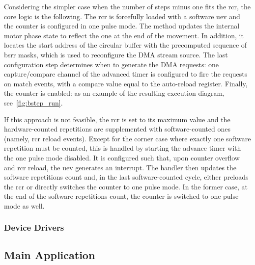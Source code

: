 Considering the simpler case when the number of steps minus one fits the \ac{rcr}, the core logic is the following.
The \ac{rcr} is forcefully loaded with a software \ac{uev} and the counter is configured in one pulse mode.
The  method updates the internal motor phase state to reflect the one at the end of the movement. In addition, it locates the start address of the circular buffer with the precomputed sequence of \ac{bsrr} masks, which is used to reconfigure the DMA stream source. The last configuration step determines when to generate the DMA requests: one capture/compare channel of the advanced timer is configured to fire the requests on match events, with a compare value equal to the auto-reload register. Finally, the counter is enabled: as an example of the resulting execution diagram, see~\cref{fig:bstep_run}. 

If this approach is not feasible, the \ac{rcr} is set to its maximum value and the hardware-counted repetitions are supplemented with software-counted ones (namely, \ac{rcr} reload events). Except for the corner case where exactly one software repetition must be counted, this is handled by starting the advance timer with the one pulse mode disabled. It is configured such that, upon counter overflow and \ac{rcr} reload, the \ac{uev} generates an interrupt. The handler then updates the software repetitions count and, in the last software-counted cycle, either preloads the \ac{rcr} or directly switches the counter to one pulse mode. In the former case, at the end of the software repetitions count, the counter is switched to one pulse mode as well.

\subsubsection{Device Drivers}\label{ssubsec:cdev}

\subsection{Main Application}

